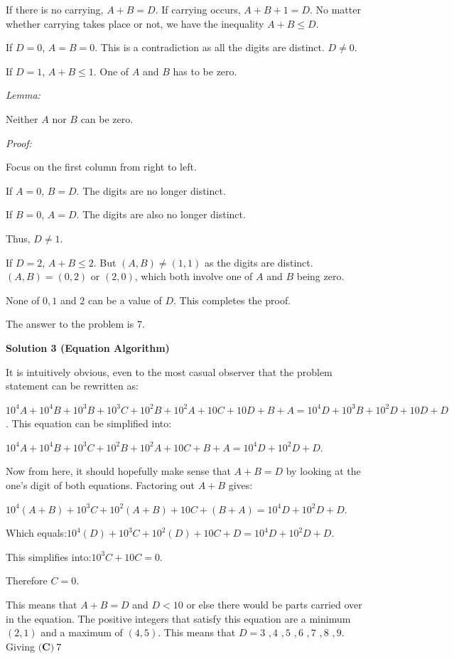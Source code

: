 \begin{enumerate}
 
If there is no carrying, $A+B=D$. If carrying occurs, $A+B+1=D$. No matter whether carrying takes place or not, we have the inequality $A+B\leq{D}$.

 
If $D=0$, $A=B=0$. This is a contradiction as all the digits are distinct. $D\neq{0}$.

 
If $D=1$, $A+B\leq{1}$. One of $A$ and $B$ has to be zero.

 
\textit{Lemma:}

 
Neither $A$ nor $B$ can be zero.

 
\textit{Proof:}

 
Focus on the first column from right to left.

 If $A=0$, $B=D$. The digits are no longer distinct.

 If $B=0$, $A=D$. The digits are also no longer distinct.

 
Thus, $D\neq{1}$.

 
If $D=2$, $A+B\leq{2}$. But $(A,B)\neq(1,1)$ as the digits are distinct. $(A,B)=(0,2)$ or $(2,0)$, which both involve one of $A$ and $B$ being zero.

 
None of $0,1$ and $2$ can be a value of $D$. This completes the proof.

 
The answer to the problem is $7$.

 



\textbf{Solution 3 (Equation Algorithm)}

It is intuitively obvious, even to the most casual observer that the problem statement can be rewritten as:

 $10^4A + 10^4B + 10^3B + 10^3C + 10^2B + 10^2A + 10C + 10D + B + A = 10^4D + 10^3B + 10^2D + 10D + D$. This equation can be simplified into:

 $10^4A + 10^4B + 10^3C + 10^2B + 10^2A + 10C + B + A = 10^4D + 10^2D + D$.

 Now from here, it should hopefully make sense that $A + B = D$ by looking at the one's digit of both equations. Factoring out $A + B$ gives:

 $10^4(A+B) + 10^3C + 10^2(A+B) + 10C + (B + A) = 10^4D + 10^2D + D$. 

 Which equals:$10^4(D) + 10^3C + 10^2(D) + 10C + D = 10^4D + 10^2D + D$. 

 This simplifies into:$10^3C + 10C = 0$.

 Therefore $C = 0$.

 This means that $A + B = D$ and $D < 10$ or else there would be parts carried over in the equation. The positive integers that satisfy this equation are a minimum $(2, 1)$ and a maximum of $(4, 5)$. This means that $D = 3$ $, 4$ $, 5$ $, 6$ $, 7$ $, 8$ $, 9$. Giving $\boxed{\textbf{(C)}\ 7}$




\end{enumerate}
